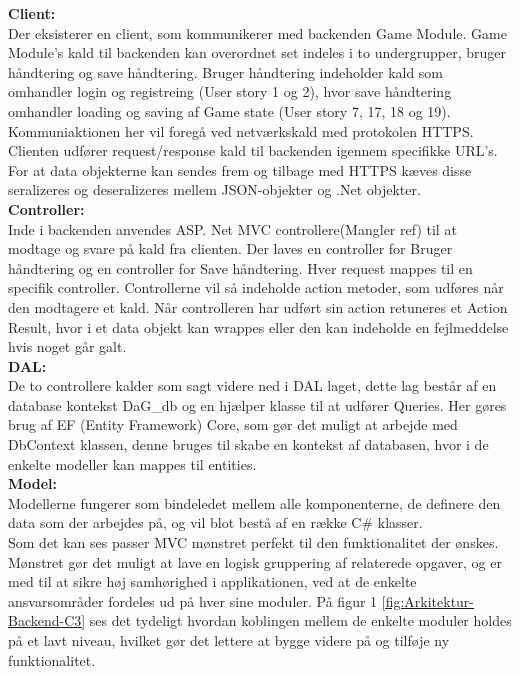 \textbf{Client:}\\
Der eksisterer en client, som kommunikerer med backenden Game Module. Game Module’s kald til backenden kan overordnet set indeles i to undergrupper, bruger håndtering og save håndtering. Bruger håndtering indeholder kald som omhandler login og registreing  (User story 1 og 2), hvor save håndtering omhandler loading og saving af Game state (User story 7, 17, 18 og 19). Kommuniaktionen her vil foregå ved netværkskald med protokolen HTTPS. Clienten udfører request/response kald til backenden igennem specifikke URL’s. For at data objekterne kan sendes frem og tilbage med HTTPS kæves disse seralizeres og deseralizeres mellem JSON-objekter og .Net objekter.\\
\textbf{Controller:}\\
Inde i backenden anvendes ASP. Net MVC controllere(Mangler ref) til at modtage og svare på kald fra clienten. Der laves en controller for Bruger håndtering og en controller for Save håndtering. Hver request mappes til en specifik controller. Controllerne vil så indeholde action metoder, som udføres når den modtagere et kald. Når controlleren har udført sin action retuneres et Action Result, hvor i et data objekt kan wrappes eller den kan indeholde en fejlmeddelse hvis noget går galt.\\
\textbf{DAL:}\\
De to controllere kalder som sagt videre ned i DAL laget, dette lag består af en database kontekst DaG\_db og en hjælper klasse til at udfører Queries. Her gøres brug af EF (Entity Framework) Core, som gør det muligt at arbejde med DbContext klassen, denne bruges til skabe en kontekst af databasen, hvor i de enkelte modeller kan mappes til entities.\\

\textbf{Model:}\\
Modellerne fungerer som bindeledet mellem alle komponenterne, de definere den data som der arbejdes på, og vil blot bestå af en række C\# klasser.\\

Som det kan ses passer MVC mønstret perfekt til den funktionalitet der ønskes. Mønstret gør det muligt at lave en logisk gruppering af relaterede opgaver, og er med til at sikre høj samhørighed i applikationen, ved at de enkelte ansvarsområder fordeles ud på hver sine moduler. På figur 1 \autoref{fig:Arkitektur-Backend-C3} ses det tydeligt hvordan koblingen mellem de enkelte moduler holdes på et lavt niveau, hvilket gør det lettere at bygge videre på og tilføje ny funktionalitet.\\


